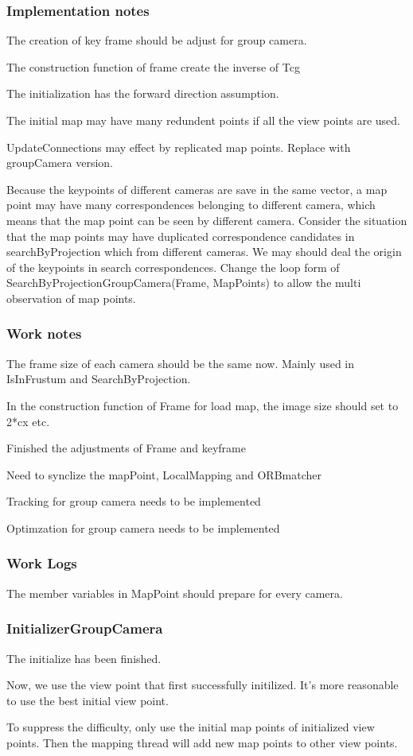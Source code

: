 \documentclass{beamer}
\begin{document}
\begin{frame}
\frametitle{Implementation notes}
\item The creation of key frame should be adjust for group camera.
\item The construction function of frame create the inverse of Tcg
\item The initialization has the forward direction assumption.
\item The initial map may have many redundent points if all the view points are used.
\item UpdateConnections may effect by replicated map points. Replace with groupCamera version.
\item Because the keypoints of different cameras are save in the same vector, a map point may have many correspondences belonging to different camera, which means that the map point can be seen by different camera. Consider the situation that the map points may have duplicated correspondence candidates in searchByProjection which from different cameras. We may should deal the origin of the keypoints in search correspondences. Change the loop form of SearchByProjectionGroupCamera(Frame, MapPoints) to allow the multi observation of map points.
\end{frame}


\begin{frame}
\frametitle{Work notes}
\item The frame size of each camera should be the same now. Mainly used in IsInFrustum and SearchByProjection.
\item In the construction function of Frame for load map, the image size should set to 2*cx etc.
\item Finished the adjustments of Frame and keyframe
\item Need to synclize the mapPoint, LocalMapping and ORBmatcher
\item Tracking for group camera needs to be implemented
\item Optimzation for group camera needs to be implemented
\end{frame}

\begin{frame}
\frametitle{Work Logs}
\item The member variables in MapPoint should prepare for every camera.

\end{frame}


\begin{frame}
\frametitle{InitializerGroupCamera}
\item The initialize has been finished.
\item Now, we use the view point that first successfully initilized. It's more reasonable to use the best initial view point.
\item To suppress the difficulty, only use the initial map points of initialized view points. Then the mapping thread will add new map points to other view points.

\end{frame}
\end{document}
